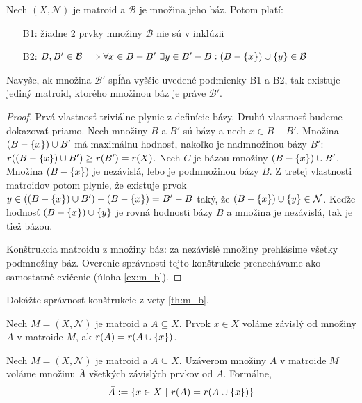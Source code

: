 \begin{theorem}
\label{th:m_b}
Nech $(X, \mathcal{N})$ je matroid a $\mathcal{B}$ je množina jeho báz. Potom platí:
\begin{enumerate}
    \item[B1:] žiadne 2 prvky množiny $\mathcal{B}$ nie sú v inklúzii
    \item[B2:] $B, B' \in \mathcal{B} \Longrightarrow \forall x \in B - B' ~\exists y \in B' - B: (B-\left\{x\right\}) \cup \left\{y\right\} \in \mathcal{B}$
\end{enumerate}

Navyše, ak množina $\mathcal{B}'$ spĺňa vyššie uvedené podmienky B1 a B2, tak existuje jediný matroid, ktorého množinou báz je práve $\mathcal{B}'$.
\end{theorem}
\begin{proof}
Prvá vlastnosť triviálne plynie z definície bázy.
Druhú vlastnosť budeme dokazovať priamo.
Nech množiny $B$ a $B'$ sú bázy a nech $x \in B - B'$.
Množina $(B - \left\{x\right\}) \cup B'$ má maximálnu hodnosť, nakoľko je nadmnožinou bázy $B'$: $r((B - \left\{x\right\}) \cup B') \geq r(B') = r(X)$. Nech $C$ je bázou množiny $(B - \left\{x\right\}) \cup B'$.
Množina $(B - \left\{x\right\})$ je nezávislá, lebo je podmnožinou bázy $B$.
Z tretej vlastnosti matroidov potom plynie, že existuje prvok $y \in ((B - \left\{x\right\}) \cup B') -(B - \left\{x\right\}) = B' - B$ taký, že $(B - \left\{x\right\}) \cup \left\{y\right\} \in \mathcal{N}$.
Keďže hodnosť $(B - \left\{x\right\}) \cup \left\{y\right\}$ je rovná hodnosti bázy $B$ a množina je nezávislá, tak je tiež bázou.

Konštrukcia matroidu z množiny báz: za nezávislé množiny prehlásime všetky podmnožiny báz.
Overenie správnosti tejto konštrukcie prenechávame ako samostatné cvičenie (úloha \ref{ex:m_b}).
\end{proof}
\begin{exercise}
\label{ex:m_b}
Dokážte správnosť konštrukcie z vety \ref{th:m_b}.
\end{exercise}

\begin{definition}
Nech $M = (X, \mathcal{N})$ je matroid a $A \subseteq X$. Prvok $x \in X$ voláme závislý od množiny $A$ v matroide $M$, ak $r(A) = r(A \cup \left\{x\right\})$.
\end{definition}

\begin{definition}
Nech $M = (X, \mathcal{N})$ je matroid a $A \subseteq X$. Uzáverom množiny $A$ v matroide $M$ voláme množinu $\bar{A}$ všetkých závislých prvkov od $A$. Formálne,
$$\bar{A} := \left\{x \in X ~|~ r(A) = r(A \cup \left\{x\right\})\right\}$$
\end{definition}

